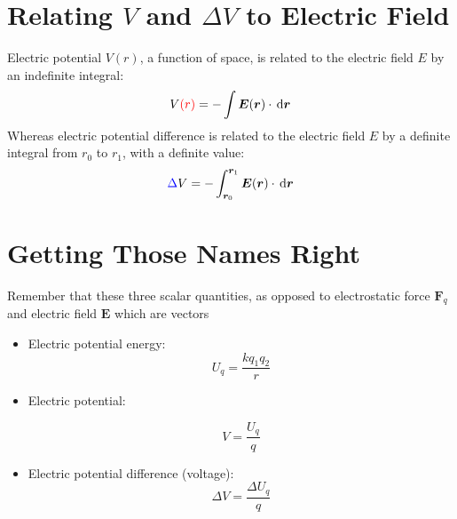 \section{Relating $V$ and $\Delta V$ to Electric Field}
Electric potential $V(r)$, a function of space, is related to the electric
field $E$ by an {\color{red}indefinite} integral:
\begin{equation}
  V{\color{red}(r)}=-\int\bm E(\bm r)\cdot\dl{\bm r}
\end{equation}
Whereas electric potential difference is related to the electric field $E$
by a {\color{blue}definite} integral from $r_0$ to $r_1$, with a definite
value:
\begin{equation}
  {\color{blue}\Delta} V
  =-\int_{\bm r_0}^{\bm r_1}
  \bm E(\bm r)\cdot\dl{\bm r}
\end{equation}




\section{Getting Those Names Right}
Remember that these three scalar quantities, as opposed to electrostatic
force $\bm F_q$ and electric field $\bm E$ which are vectors
\begin{itemize}
\item Electric potential energy:
  \begin{equation}
    U_q=\frac{kq_1q_2}r
  \end{equation}
  \item Electric potential:

    \begin{equation}
      V=\frac{U_q}q
    \end{equation}
  \item Electric potential difference (voltage):
    \begin{equation}
      \Delta V=\frac{\Delta U_q}q
    \end{equation}
  \end{itemize}






